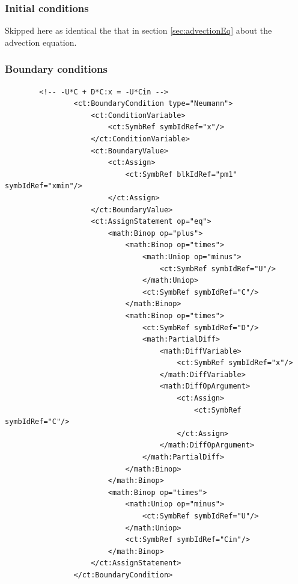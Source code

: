 \subsubsection*{Initial conditions}
Skipped here as identical the that in section \ref{sec:advectionEq} about the 
advection equation.

\subsubsection*{Boundary conditions}

\lstset{language=XML}
\begin{lstlisting}
		<!-- -U*C + D*C:x = -U*Cin -->
                <ct:BoundaryCondition type="Neumann">
                    <ct:ConditionVariable>
                        <ct:SymbRef symbIdRef="x"/>
                    </ct:ConditionVariable>
                    <ct:BoundaryValue>
                        <ct:Assign>
                            <ct:SymbRef blkIdRef="pm1" symbIdRef="xmin"/>
                        </ct:Assign>
                    </ct:BoundaryValue>
                    <ct:AssignStatement op="eq">
                        <math:Binop op="plus">
                            <math:Binop op="times">
                                <math:Uniop op="minus">
                                    <ct:SymbRef symbIdRef="U"/>
                                </math:Uniop>
                                <ct:SymbRef symbIdRef="C"/>
                            </math:Binop>
                            <math:Binop op="times">
                                <ct:SymbRef symbIdRef="D"/>
                                <math:PartialDiff>
                                    <math:DiffVariable>
                                        <ct:SymbRef symbIdRef="x"/>
                                    </math:DiffVariable>
                                    <math:DiffOpArgument>
                                        <ct:Assign>
                                            <ct:SymbRef symbIdRef="C"/>
                                        </ct:Assign>
                                    </math:DiffOpArgument>
                                </math:PartialDiff>
                            </math:Binop>
                        </math:Binop>
                        <math:Binop op="times">
                            <math:Uniop op="minus">
                                <ct:SymbRef symbIdRef="U"/>
                            </math:Uniop>
                            <ct:SymbRef symbIdRef="Cin"/>
                        </math:Binop>
                    </ct:AssignStatement>
                </ct:BoundaryCondition>
                

\end{lstlisting}
